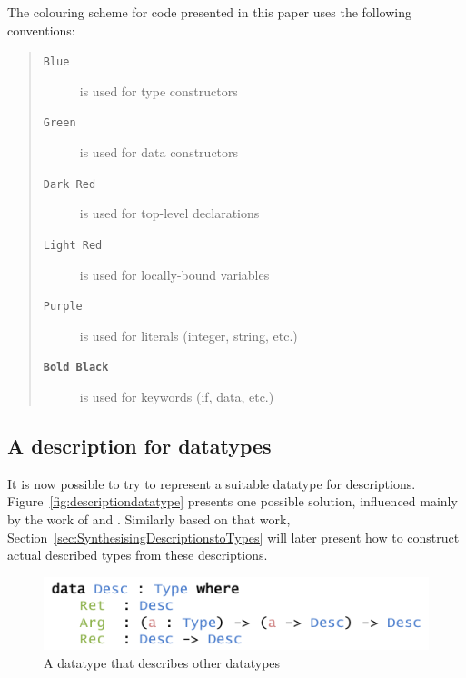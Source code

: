 \documentclass{ituthesis}
\newcommand{\ttconstructor}[1]{\textcolor{constructor-color}{\texttt{#1}}}
\newcommand{\tttype}[1]{\textcolor{type-color}{\texttt{#1}}}
\newcommand{\ttdec}[1]{\textcolor{declared-var-color}{\texttt{#1}}}
\newcommand{\ttvar}[1]{\textcolor{local-var-color}{\texttt{#1}}}
\newcommand{\ttliteral}[1]{\textcolor{literal-color}{\texttt{#1}}}
\theoremstyle{break}
\newenvironment{asideblock}
  {\begin{mdframed}[style=0,%
      leftline=false,rightline=false,leftmargin=2em,rightmargin=2em,%
          innerleftmargin=0pt,innerrightmargin=0pt,linewidth=0.75pt,%
      skipabove=7pt,skipbelow=7pt]\small}
  {\end{mdframed}}
\begin{document}
\begin{asideblock}
  The colouring scheme for code presented in this paper uses the following conventions:
  \begin{quote}
  \begin{description}
    \item[\tttype{Blue}] is used for type constructors
    \item[\ttconstructor{Green}] is used for data constructors
    \item[\ttdec{Dark Red}] is used for top-level declarations
    \item[\ttvar{Light Red}] is used for locally-bound variables
    \item[\ttliteral{Purple}] is used for literals (integer, string, etc.)
    \item[\texttt{\textbf{Bold Black}}] is used for keywords (if, data, etc.)
  \end{description}
  \end{quote}

\end{asideblock}

\subsection{A description for datatypes}
\label{sub:ADescriptionforDatatypes}
It is now possible to try to represent a suitable datatype for descriptions.
Figure~\ref{fig:descriptiondatatype} presents one possible solution, influenced mainly by the work of \textcite{mcbride2010ornamental} and \textcite{diehl2014eliminators}.
Similarly based on that work, Section~\ref{sec:SynthesisingDescriptionstoTypes} will later present how to construct actual described types from these descriptions.

\begin{figure}[ht]
\begin{center}
    \includegraphics[scale=0.5]{Figures/ADescriptionforDatatypesSimple.png}
\end{center}
\caption{A datatype that describes other datatypes}
\label{fig:simpldescdatatype}
\end{figure}
\end{document}
